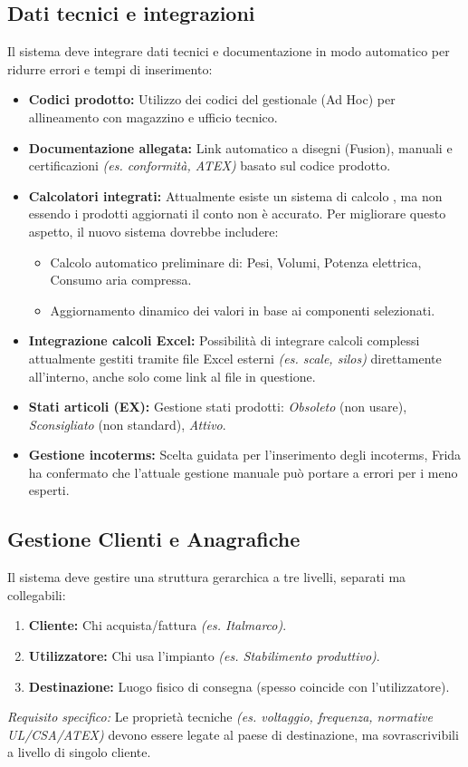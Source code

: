 \documentclass[12pt, a4paper]{article} %
\begin{document}
\subsection{Dati tecnici e integrazioni}
Il sistema deve integrare dati tecnici e documentazione in modo automatico per
ridurre errori e tempi di inserimento:
\begin{itemize}
      \item \textbf{Codici prodotto:} Utilizzo dei codici del gestionale (Ad Hoc) per allineamento con magazzino e ufficio tecnico.
      \item \textbf{Documentazione allegata:} Link automatico a disegni (Fusion), manuali e certificazioni \textit{(es. conformità, ATEX)} basato sul codice prodotto.
      \item \textbf{Calcolatori integrati:}
            Attualmente esiste un sistema di calcolo , ma non essendo i prodotti aggiornati il conto non è accurato.
            Per migliorare questo aspetto, il nuovo sistema dovrebbe includere:
            \begin{itemize}
                  \item Calcolo automatico preliminare di: Pesi, Volumi, Potenza elettrica, Consumo
                        aria compressa.
                  \item Aggiornamento dinamico dei valori in base ai componenti selezionati.
            \end{itemize}
      \item \textbf{Integrazione calcoli Excel:} Possibilità di integrare calcoli complessi attualmente gestiti tramite file Excel esterni \textit{(es. scale, silos)}
            direttamente all'interno, anche solo come link al file in questione.
      \item \textbf{Stati articoli (EX):} Gestione stati prodotti: \textit{Obsoleto} (non usare), \textit{Sconsigliato} (non standard), \textit{Attivo}.
      \item \textbf{Gestione incoterms:} Scelta guidata per l'inserimento degli incoterms, Frida ha confermato che l'attuale gestione manuale può portare a errori per i meno esperti.
\end{itemize}

\subsection{Gestione Clienti e Anagrafiche}
Il sistema deve gestire una struttura gerarchica a tre livelli, separati ma
collegabili:
\begin{enumerate}
      \item \textbf{Cliente:} Chi acquista/fattura \textit{(es. Italmarco)}.
      \item \textbf{Utilizzatore:} Chi usa l'impianto \textit{(es. Stabilimento produttivo)}.
      \item \textbf{Destinazione:} Luogo fisico di consegna (spesso coincide con l'utilizzatore).
\end{enumerate}
\textit{Requisito specifico:} Le proprietà tecniche \textit{(es. voltaggio, frequenza, normative UL/CSA/ATEX)} devono essere legate al paese di destinazione,
ma sovrascrivibili a livello di singolo cliente.
\end{document}
